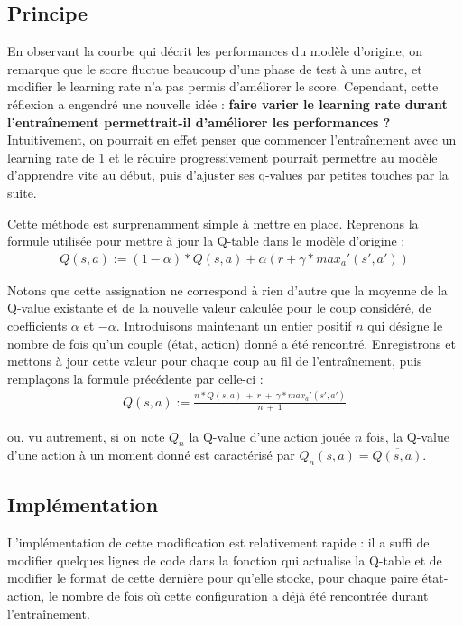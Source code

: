 \documentclass[french]{article}
\begin{document}
    \subsection{Principe}

    En observant la courbe qui décrit les performances du modèle d'origine, on remarque que le score fluctue beaucoup d'une phase de test à une autre, et modifier le learning rate n'a pas permis d'améliorer le score. Cependant, cette réflexion a engendré une nouvelle idée : \textbf{faire varier le learning rate durant l'entraînement permettrait-il d'améliorer les performances ?} Intuitivement, on pourrait en effet penser que commencer l'entraînement avec un learning rate de 1 et le réduire progressivement pourrait permettre au modèle d'apprendre vite au début, puis d'ajuster ses q-values par petites touches par la suite.

    Cette méthode est surprenamment simple à mettre en place. Reprenons la formule utilisée pour mettre à jour la Q-table dans le modèle d'origine :
    \begin{align*}
        Q(s,a) := (1-\alpha)*Q(s,a) + \alpha(r + \gamma * max_a'(s',a'))
    \end{align*}

    Notons que cette assignation ne correspond à rien d'autre que la moyenne de la Q-value existante et de la nouvelle valeur calculée pour le coup considéré, de coefficients $\alpha$ et $-\alpha$. Introduisons maintenant un entier positif $n$ qui désigne le nombre de fois qu'un couple (état, action) donné a été rencontré. Enregistrons et mettons à jour cette valeur pour chaque coup au fil de l'entraînement, puis remplaçons la formule précédente par celle-ci :
    \begin{align*}
        Q(s,a) := \frac{n*Q(s,a) \:+ \:r \:+ \:\gamma * max_a'(s',a')}{n\:+\:1}
    \end{align*}

    ou, vu autrement, si on note $Q_n$ la Q-value d'une action jouée $n$ fois, la Q-value d'une action à un moment donné est caractérisé par $Q_n(s,a) = \overline{Q(s,a)}$.

    \subsection{Implémentation}

    L'implémentation de cette modification est relativement rapide : il a suffi de modifier quelques lignes de code dans la fonction qui actualise la Q-table et de modifier le format de cette dernière pour qu'elle stocke, pour chaque paire état-action, le nombre de fois où cette configuration a déjà été rencontrée durant l'entraînement.
\end{document}
